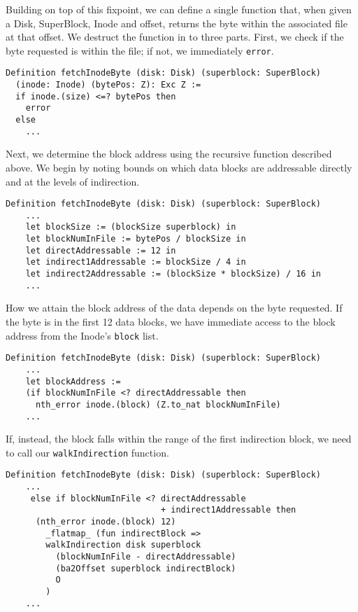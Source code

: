 \documentclass[nocopyrightspace]{sigplanconf}
\begin{document}
Building on top of this fixpoint, we can define a single function that, when
given a Disk, SuperBlock, Inode and offset, returns the byte within the
associated file at that offset. We destruct the function in to three parts.
First, we check if the byte requested is within the file; if not, we
immediately {\tt error}.

\begin{lstlisting}
Definition fetchInodeByte (disk: Disk) (superblock: SuperBlock)
  (inode: Inode) (bytePos: Z): Exc Z :=
  if inode.(size) <=? bytePos then 
    error
  else 
    ...
\end{lstlisting}

Next, we determine the block address using the recursive function described
above. We begin by noting bounds on which data blocks are addressable directly
and at the levels of indirection.

\begin{lstlisting}
Definition fetchInodeByte (disk: Disk) (superblock: SuperBlock)
    ...
    let blockSize := (blockSize superblock) in
    let blockNumInFile := bytePos / blockSize in
    let directAddressable := 12 in
    let indirect1Addressable := blockSize / 4 in
    let indirect2Addressable := (blockSize * blockSize) / 16 in
    ...
\end{lstlisting}

How we attain the block address of the data depends on the byte requested. If
the byte is in the first 12 data blocks, we have immediate access to the block
address from the Inode's {\tt block} list.

\begin{lstlisting}
Definition fetchInodeByte (disk: Disk) (superblock: SuperBlock)
    ...
    let blockAddress :=
    (if blockNumInFile <? directAddressable then
      nth_error inode.(block) (Z.to_nat blockNumInFile)
    ...
\end{lstlisting}

If, instead, the block falls within the range of the first indirection block,
we need to call our {\tt walkIndirection} function.

\begin{lstlisting}
Definition fetchInodeByte (disk: Disk) (superblock: SuperBlock)
    ...
     else if blockNumInFile <? directAddressable
                               + indirect1Addressable then
      (nth_error inode.(block) 12) 
        _flatmap_ (fun indirectBlock =>
        walkIndirection disk superblock
          (blockNumInFile - directAddressable)
          (ba2Offset superblock indirectBlock) 
          O
        )
    ...
\end{lstlisting}
\end{document}
